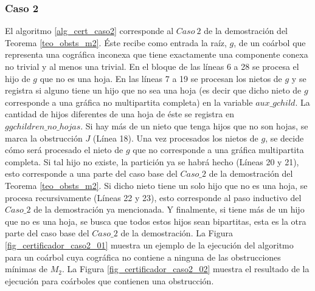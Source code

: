 \subsubsection{Caso 2}

El algoritmo \ref{alg_cert_caso2} corresponde al $Caso\ 2$ de la demostración del Teorema \ref{teo_obsts_m2}. Éste recibe como entrada la raíz, $g$, de un coárbol que representa una cográfica inconexa que tiene exactamente una componente conexa no trivial y al menos una trivial. En el bloque de las líneas 6 a 28 se procesa el hijo de $g$ que no es una hoja. En las líneas 7 a 19 se procesan los nietos de $g$ y se registra si alguno tiene un hijo que no sea una hoja (es decir que dicho nieto de $g$ corresponde a una gráfica no multipartita completa) en la variable $aux\_gchild$. La cantidad de hijos diferentes de una hoja de éste se registra en $ggchildren\_no\_hojas$. Si hay más de un nieto que tenga hijos que no son hojas, se marca la obstrucción $J$ (Línea 18). Una vez procesados los nietos de $g$, se decide cómo será procesado el nieto de $g$ que no corresponde a una gráfica multipartita completa. Si tal hijo no existe, la partición ya se habrá hecho (Líneas 20 y 21), esto corresponde a una parte del caso base del $Caso\_2$ de la demostración del Teorema \ref{teo_obsts_m2}. Si dicho nieto tiene un solo hijo que no es una hoja, se procesa recursivamente (Líneas 22 y 23), esto corresponde al paso inductivo del $Caso\_2$ de la demostración ya mencionada. Y finalmente, si tiene más de un hijo que no es una hoja, se busca que todos estos hijos sean bipartitas, esta es la otra parte del caso base del $Caso\_2$ de la demostración. La Figura \ref{fig_certificador_caso2_01} muestra un ejemplo de la ejecución del algoritmo para un coárbol cuya cográfica no contiene a ninguna de las obstrucciones mínimas de $M_2$. La Figura \ref{fig_certificador_caso2_02} muestra el resultado de la ejecución para coárboles que contienen una obstrucción.




